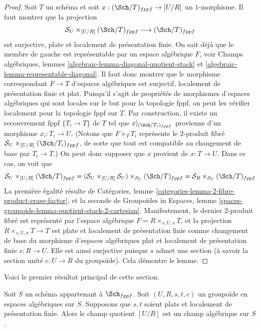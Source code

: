 \begin{proof}
Soit $T$ un schéma et soit $x : (\Sch/T)_{fppf} \to [U/R]$
un $1$-morphisme. Il faut montrer que la projection
$$
\mathcal{S}_U \times_{[U/R]} (\Sch/T)_{fppf}
\longrightarrow
(\Sch/T)_{fppf}
$$
est surjective, plate et localement de présentation finie.
On sait déjà que le membre de gauche
est représentable par un espace algébrique $F$, voir
Champs algébriques, lemmes \ref{algebraic-lemma-diagonal-quotient-stack} et
\ref{algebraic-lemma-representable-diagonal}.
Il faut donc montrer que le morphisme correspondant $F \to T$ d'espaces
algébriques est surjectif, localement de présentation finie et plat.
Puisqu'il s'agit de propriétés de morphismes d'espaces
algébriques qui sont locales sur le but pour la topologie fppf, on
peut les vérifier localement pour la topologie fppf sur $T$. Par construction, il existe
un recouvrement fppf $\{T_i \to T\}$ de $T$ tel que
$x|_{(\Sch/T_i)_{fppf}}$ provienne d'un morphisme
$x_i : T_i \to U$. (Notons que $F \times_T T_i$ représente le
$2$-produit fibré $\mathcal{S}_U \times_{[U/R]} (\Sch/T_i)_{fppf}$,
de sorte que tout est compatible au changement de base par $T_i \to T$.)
On peut donc supposer que $x$ provient de $x : T \to U$.
Dans ce cas, on voit que
$$
\mathcal{S}_U \times_{[U/R]} (\Sch/T)_{fppf}
=
(\mathcal{S}_U \times_{[U/R]} \mathcal{S}_U)
\times_{\mathcal{S}_U} (\Sch/T)_{fppf}
=
\mathcal{S}_R \times_{\mathcal{S}_U} (\Sch/T)_{fppf}
$$
La première égalité résulte de
Catégories, lemme \ref{categories-lemma-2-fibre-product-erase-factor},
et la seconde de
Groupoïdes in Espaces,
lemme \ref{spaces-groupoids-lemma-quotient-stack-2-cartesian}.
Manifestement, le dernier $2$-produit fibré est représenté par l'espace
algébrique $F = R \times_{s, U, x} T$, et la projection
$R \times_{s, U, x} T \to T$ est plate et localement de présentation finie
comme changement de base du morphisme d'espaces algébriques
plat et localement de présentation finie $s : R \to U$.
Elle est aussi surjective puisque $s$ admet une section (à savoir la section unité
$e : U \to R$ du groupoïde).
Cela démontre le lemme.
\end{proof}

\noindent
Voici le premier résultat principal de cette section.

\begin{theorem}
\label{theorem-flat-groupoid-gives-algebraic-stack}
Soit $S$ un schéma appartenant à $\Sch_{fppf}$.
Soit $(U, R, s, t, c)$ un groupoïde en espaces algébriques sur $S$.
Supposons que $s, t$ soient plats et localement de présentation finie.
Alors le champ quotient $[U/R]$ est un champ algébrique sur $S$.
\end{theorem}

